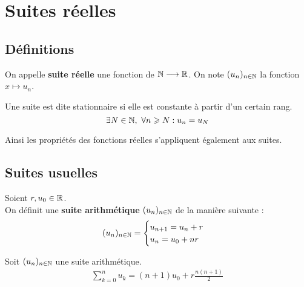 \chapter{Suites réelles}
\def\arraystretch{1}

\section{Définitions}

\begin{definition}
    On appelle \textbf{suite réelle} une fonction de $\mathbb{N} \longrightarrow \mathbb{R}$. 
    On note $(u_n)_{n \in \mathbb{N}}$ la fonction $x \mapsto u_n$.
\end{definition}

\begin{definition}
	Une suite est dite stationnaire si elle est constante à partir d'un certain rang. 
	\[ \exists N \in \mathbb{N},\ \forall n \geqslant N : u_n = u_N \]
\end{definition}

\begin{remark}
    Ainsi les propriétés des fonctions réelles s'appliquent également aux suites.
\end{remark}

\section{Suites usuelles}
\begin{definition}
    Soient $r, u_0 \in \mathbb{R}$.
    \\
    On définit une \textbf{suite arithmétique} $(u_n)_{n \in \mathbb{N}}$ de la manière suivante :
    \begin{align*}
        (u_n)_{n \in \mathbb{N}} =
        \begin{cases}
            u_{n+1} = u_n + r \\ 
            u_n = u_0 + nr
        \end{cases}
    \end{align*}
\end{definition}

\begin{proposition}
    Soit $(u_n)_{n \in \mathbb{N}}$ une suite arithmétique.
    \begin{align*}
        \sum_{k = 0}^{n} u_k = (n+1)u_0 + r \frac{n(n+1)}{2}
    \end{align*}
\end{proposition}

